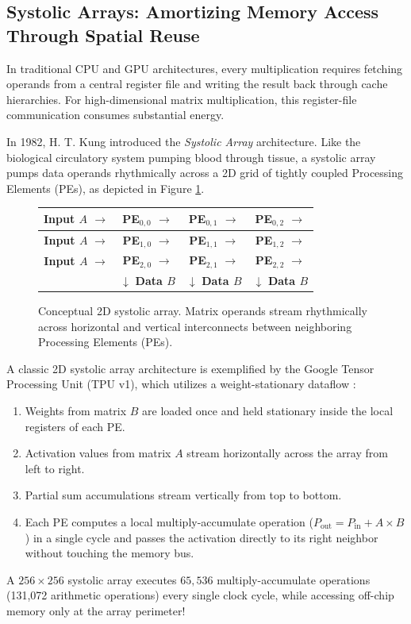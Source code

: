 \subsection{Systolic Arrays: Amortizing Memory Access Through Spatial Reuse}
In traditional CPU and GPU architectures, every multiplication requires fetching operands from a central register file and writing the result back through cache hierarchies. For high-dimensional matrix multiplication, this register-file communication consumes substantial energy.

In 1982, H. T. Kung introduced the \textit{Systolic Array} architecture. Like the biological circulatory system pumping blood through tissue, a systolic array pumps data operands rhythmically across a 2D grid of tightly coupled Processing Elements (PEs), as depicted in Figure \ref{fig:systolic_array}.

\begin{figure}[htbp]
  \begin{center}
    \small
    \begin{tabular}{|c|c|c|c|}
      \hline
      \textbf{Input $A$} $\to$ & \textbf{PE}$_{0,0}$ $\to$ & \textbf{PE}$_{0,1}$ $\to$ & \textbf{PE}$_{0,2}$ $\to$ \\ \hline
      \textbf{Input $A$} $\to$ & \textbf{PE}$_{1,0}$ $\to$ & \textbf{PE}$_{1,1}$ $\to$ & \textbf{PE}$_{1,2}$ $\to$ \\ \hline
      \textbf{Input $A$} $\to$ & \textbf{PE}$_{2,0}$ $\to$ & \textbf{PE}$_{2,1}$ $\to$ & \textbf{PE}$_{2,2}$ $\to$ \\ \hline
      & $\downarrow$ \textbf{Data $B$} & $\downarrow$ \textbf{Data $B$} & $\downarrow$ \textbf{Data $B$} \\ \hline
    \end{tabular}
    \caption{Conceptual 2D systolic array. Matrix operands stream rhythmically across horizontal and vertical interconnects between neighboring Processing Elements (PEs).}
    \label{fig:systolic_array}
  \end{center}
\end{figure}

A classic 2D systolic array architecture is exemplified by the Google Tensor Processing Unit (TPU v1), which utilizes a weight-stationary dataflow \cite{jouppi2017indatacenter}:
\begin{enumerate}
    \item Weights from matrix $B$ are loaded once and held stationary inside the local registers of each PE.
    \item Activation values from matrix $A$ stream horizontally across the array from left to right.
    \item Partial sum accumulations stream vertically from top to bottom.
    \item Each PE computes a local multiply-accumulate operation ($P_{\text{out}} = P_{\text{in}} + A \times B$) in a single cycle and passes the activation directly to its right neighbor without touching the memory bus.
\end{enumerate}
A $256 \times 256$ systolic array executes $65,536$ multiply-accumulate operations (131,072 arithmetic operations) every single clock cycle, while accessing off-chip memory only at the array perimeter!

